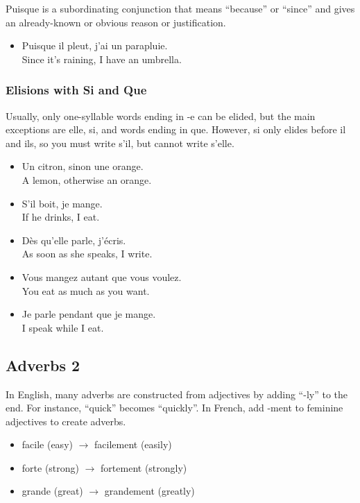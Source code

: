 Puisque is a subordinating conjunction that means ``because'' or ``since'' and gives an already-known or obvious reason or justification.

\begin{itemize}
  \item  Puisque il pleut, j'ai un parapluie. \\ Since it's raining, I have an umbrella.
\end{itemize}

\subsubsection{Elisions with Si and Que}

Usually, only one-syllable words ending in -e can be elided, but the main exceptions are elle, si, and words ending in que. However, si only elides before il and ils, so you must write s'il, but cannot write s'elle.

\begin{itemize}
  \item  Un citron, sinon une orange. \\ A lemon, otherwise an orange.
  \item  S'il boit, je mange. \\ If he drinks, I eat.
  \item  D{\`e}s qu'elle parle, j'{\'e}cris. \\ As soon as she speaks, I write.
  \item  Vous mangez autant que vous voulez. \\ You eat as much as you want.
  \item  Je parle pendant que je mange. \\ I speak while I eat.
\end{itemize}


\pagebreak
\subsection{Adverbs 2}

In English, many adverbs are constructed from adjectives by adding ``-ly'' to the end. For instance, ``quick'' becomes ``quickly''. In French, add -ment to feminine adjectives to create adverbs.

\begin{itemize}
  \item  facile (easy) $\rightarrow$ facilement (easily)
  \item  forte (strong) $\rightarrow$ fortement (strongly) 
  \item  grande (great) $\rightarrow$ grandement (greatly)
\end{itemize}

